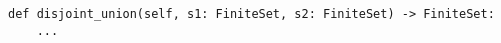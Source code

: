 \begin{verbatim}
def disjoint_union(self, s1: FiniteSet, s2: FiniteSet) -> FiniteSet:
    ...
\end{verbatim}